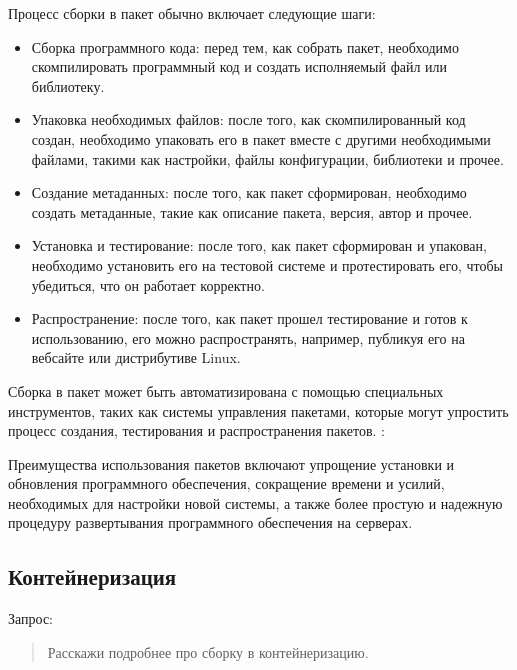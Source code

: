 \documentclass[letterpaper,10pt,russian]{sphinxmanual}
\begin{document}
\sphinxAtStartPar
Процесс сборки в пакет обычно включает следующие шаги:
\begin{itemize}
\item {} 
\sphinxAtStartPar
Сборка программного кода: перед тем, как собрать пакет, необходимо скомпилировать программный код и создать исполняемый файл или библиотеку.

\item {} 
\sphinxAtStartPar
Упаковка необходимых файлов: после того, как скомпилированный код создан, необходимо упаковать его в пакет вместе с другими необходимыми файлами, такими как настройки, файлы конфигурации, библиотеки и прочее.

\item {} 
\sphinxAtStartPar
Создание метаданных: после того, как пакет сформирован, необходимо создать метаданные, такие как описание пакета, версия, автор и прочее.

\item {} 
\sphinxAtStartPar
Установка и тестирование: после того, как пакет сформирован и упакован, необходимо установить его на тестовой системе и протестировать его, чтобы убедиться, что он работает корректно.

\item {} 
\sphinxAtStartPar
Распространение: после того, как пакет прошел тестирование и готов к использованию, его можно распространять, например, публикуя его на веб\sphinxhyphen{}сайте или дистрибутиве Linux.

\end{itemize}

\sphinxAtStartPar
Сборка в пакет может быть автоматизирована с помощью специальных инструментов, таких как системы управления пакетами, которые могут упростить процесс создания, тестирования и распространения пакетов. : 

\sphinxAtStartPar
Преимущества использования пакетов включают упрощение установки и обновления программного обеспечения, сокращение времени и усилий, необходимых для настройки новой системы, а также более простую и надежную процедуру развертывания программного обеспечения на серверах.


\subsection{Контейнеризация}
\label{\detokenize{educational_materials/stages/content:id21}}
\sphinxAtStartPar
Запрос:
\begin{quote}

\sphinxAtStartPar
Расскажи подробнее про сборку в контейнеризацию.
\end{quote}
\end{document}
